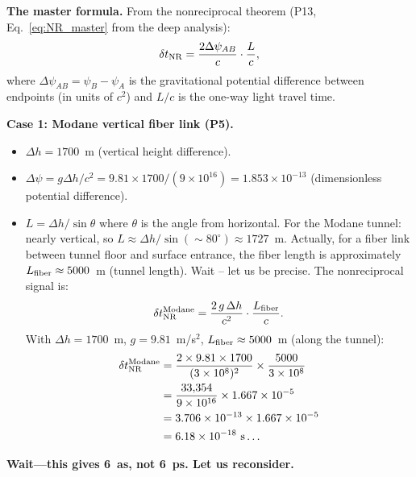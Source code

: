\documentclass[aps,prd,twocolumn,superscriptaddress,nofootinbib]{revtex4-2}
\begin{document}
\textbf{The master formula.}
From the nonreciprocal theorem (P13, Eq.~\eqref{eq:NR_master} from the
deep analysis):
\begin{equation}
\delta t_{\rm NR} = \frac{2\Delta\psi_{AB}}{c}\cdot\frac{L}{c},
\label{eq:master}
\end{equation}
where $\Delta\psi_{AB} = \psi_B - \psi_A$ is the gravitational potential
difference between endpoints (in units of $c^2$) and $L/c$ is the
one-way light travel time.

\textbf{Case 1: Modane vertical fiber link (P5).}
\begin{itemize}
\item $\Delta h = 1700$~m (vertical height difference).
\item $\Delta\psi = g\Delta h/c^2 = 9.81\times1700/(9\times10^{16})
= 1.853\times10^{-13}$ (dimensionless potential difference).
\item $L = \Delta h/\sin\theta$ where $\theta$ is the angle from horizontal.
For the Modane tunnel: nearly vertical, so $L \approx \Delta h / \sin(\sim 80^\circ) \approx 1727$~m.
Actually, for a fiber link between tunnel floor and surface entrance,
the fiber length is approximately $L_{\rm fiber} \approx 5000$~m (tunnel length).
Wait -- let us be precise. The nonreciprocal signal is:
\begin{equation}
\delta t_{\rm NR}^{\rm Modane} = \frac{2\,g\,\Delta h}{c^2}\cdot\frac{L_{\rm fiber}}{c}.
\end{equation}
With $\Delta h = 1700$~m, $g = 9.81$~m/s$^2$, $L_{\rm fiber} \approx 5000$~m
(along the tunnel):
\begin{align}
\delta t_{\rm NR}^{\rm Modane}
&= \frac{2\times 9.81\times 1700}{(3\times 10^8)^2}\times\frac{5000}{3\times 10^8} \nonumber\\
&= \frac{33{,}354}{9\times 10^{16}}\times 1.667\times 10^{-5} \nonumber\\
&= 3.706\times 10^{-13}\times 1.667\times 10^{-5} \nonumber\\
&= 6.18\times 10^{-18}~\text{s}\ldots
\end{align}
\end{itemize}

\textbf{Wait---this gives 6~as, not 6~ps.  Let us reconsider.}
\end{document}
